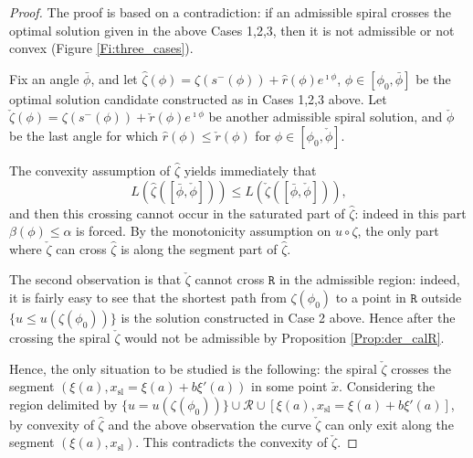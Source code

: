 \documentclass[reqno]{amsart}
\newcounter{assu}
\theoremstyle{definition} \newtheorem{definition}{Definition}[section]
\theoremstyle{definition} \newtheorem{remark}[definition]{Remark}
\theoremstyle{plain} \newtheorem{lemma}[definition]{Lemma}
\theoremstyle{plain} \newtheorem{proposition}[definition]{Proposition}
\theoremstyle{plain} \newtheorem{theorem}[definition]{Theorem}
\theoremstyle{plain} \newtheorem{corollary}[definition]{Corollary}
\theoremstyle{definition} \newtheorem{example}[definition]{Example}
\theoremstyle{plain} \newtheorem{claim}[clai]{Claim}
\theoremstyle{definition} \newtheorem{assumption}[definition]{Assumption}
\theoremstyle{definition} \newtheorem{observation}[definition]{Observation}
\newcommand{\1}{\mathbbm 1}
\renewcommand{\i}{\imath}
\numberwithin{equation}{section} %
\theoremstyle{plain} \newtheorem*{theorem*}{Theorem}
\theoremstyle{plain} \newtheorem{mthm}[maintheorem]{Main Theorem}
\theoremstyle{plain} \newtheorem*{mthm*}{Main Theorem}
\theoremstyle{plain} \newtheorem*{conjecture*}{Conjecture}
\theoremstyle{plain} \newtheorem{conjecture}[definition]{Conjecture}
\theoremstyle{plain} \newtheorem*{problem*}{Problem}
\begin{document}
\begin{proof}
The proof is based on a contradiction: if an admissible spiral crosses the optimal solution given in the above Cases 1,2,3, then it is not admissible or not convex (Figure \ref{Fi:three_cases}).

Fix an angle ${\bar \phi}$, and let $\hat \zeta(\phi) = \zeta(s^-(\phi)) + \hat r(\phi) e^{\i \phi}$, $\phi \in [{\phi_0},{\bar \phi}]$ be the optimal solution candidate constructed as in Cases 1,2,3 above. Let $\check \zeta(\phi) = \zeta(s^-(\phi)) + \check r(\phi) e^{\i \phi}$ be another admissible spiral solution, and $\check \phi$ be the last angle for which $\hat r(\phi) \leq \check r(\phi)$ for $\phi \in [{\phi_0},\check \phi]$.

The convexity assumption of $\hat \zeta$ yields immediately that
\begin{equation*}
L(\hat \zeta([{\bar \phi},\check \phi])) \leq L(\check \zeta([{\bar \phi},\check \phi])),
\end{equation*}
and then this crossing cannot occur in the saturated part of $\hat \zeta$: indeed in this part $\beta(\phi) \leq \alpha$ is forced. By the monotonicity assumption on $u \circ \zeta$, the only part where $\check \zeta$ can cross $\hat \zeta$ is along the segment part of $\hat \zeta$.

The second observation is that $\check \zeta$ cannot cross $\mathtt R$ in the admissible region: indeed, it is fairly easy to see that the shortest path from $\zeta({\phi_0})$ to a point in $\mathtt R$ outside $\{u \leq u(\zeta({\phi_0}))\}$ is the solution constructed in Case 2 above. Hence after the crossing the spiral $\check \zeta$ would not be admissible by Proposition \ref{Prop:der_calR}.

Hence, the only situation to be studied is the following: the spiral $\check \zeta$ crosses the segment $(\xi(a),x_\mathrm{sl} = \xi(a) + b \xi'(a))$ in some point $\check x$. Considering the region delimited by $\{u = u(\zeta(\phi_0))\} \cup \mathcal R \cup [\xi(a),x_\mathrm{sl} = \xi(a) + b \xi'(a)]$, by convexity of $\hat \zeta$ and the above observation the curve $\check \zeta$ can only exit along the segment $(\xi(a),x_\mathrm{sl})$. This contradicts the convexity of $\check \zeta$. %
\end{proof}
\end{document}
